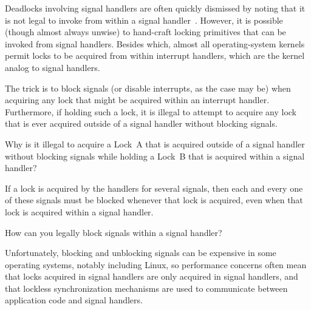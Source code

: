 Deadlocks involving signal handlers are often quickly dismissed by
noting that it is not legal to invoke  from
within a signal handler~\cite{OpenGroup1997pthreads}.
However, it is possible (though almost always unwise) to hand-craft
locking primitives that can be invoked from signal handlers.
Besides which, almost all operating-system kernels permit locks to
be acquired from within interrupt handlers, which are the kernel analog
to signal handlers.

The trick is to block signals (or disable interrupts, as the case may be)
when acquiring any lock that might be acquired within an interrupt
handler.
Furthermore, if holding such a lock, it is illegal to attempt to
acquire any lock that is ever acquired
outside of a signal handler without blocking signals.

\QuickQuiz{}
	Why is it illegal to acquire a Lock~A that is acquired outside
	of a signal handler without blocking signals while holding
	a Lock~B that is acquired within a signal handler?
 \QuickQuizEnd

If a lock is acquired by the handlers for several signals, then each
and every one of these signals must be blocked whenever that lock is
acquired, even when that
lock is acquired within a signal handler.

\QuickQuiz{}
	How can you legally block signals within a signal handler?
 \QuickQuizEnd

Unfortunately, blocking and unblocking signals can be expensive in
some operating systems, notably including Linux, so performance
concerns often mean that locks acquired in signal handlers are only
acquired in signal handlers, and that lockless synchronization
mechanisms are used to communicate between application code and
signal handlers.

